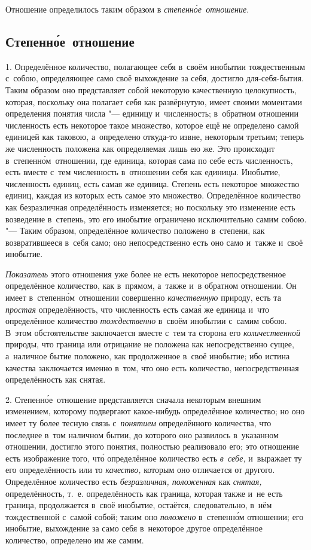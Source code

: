 Отношение определилось таким образом в {\em степенн\'{о}е~отношение}.

\subsection{Степенн\'{о}е~отношение}

1. Определённое количество, полагающее себя в~своём инобытии тождественным
с~собою, определяющее само своё выхождение за себя, достигло для-себя-бытия.
Таким образом оно представляет собой некоторую качественную целокупность,
которая, поскольку она полагает себя как развёрнутую, имеет своими моментами
определения понятия числа "--- единицу и~численность; в~обратном отношении
численность есть некоторое такое множество, которое ещё не определено самой
единицей как таковою, а~определено откуда-то извне, некоторым третьим; теперь
же численность положена как определяемая лишь ею же. Это происходит
в~степенн\'{о}м~отношении, где единица, которая сама по себе есть численность,
есть вместе с~тем численность в~отношении себя как единицы. Инобытие,
численность единиц, есть самая же единица. Степень есть некоторое множество
единиц, каждая из которых есть самое это множество. Определённое количество как
безразличная определённость изменяется; но поскольку это изменение есть
возведение в~степень, это его инобытие ограничено исключительно самим собою.
"--- Таким образом, определённое количество положено в~степени, как
возвратившееся в~себя само; оно непосредственно есть оно само и~также
и~своё инобытие.

{\em Показатель} этого отношения уже более не есть некоторое непосредственное
определённое количество, как в~прямом, а~также и~в обратном отношении. Он имеет
в~степенн\'{о}м~отношении совершенно {\em качественную} природу, есть та
{\em простая} определённость, что численность есть сама\'{я} же единица и~что
определённое количество {\em тождественно} в~своём инобытии с~самим собою.
В~этом обстоятельстве заключается вместе с~тем та сторона его
{\em количественной} природы, что граница или отрицание не положена как
непосредственно сущее, а~наличное бытие положено, как продолженное в~своё
инобытие; ибо истина качества заключается именно в~том, что оно есть
количество, непосредственная определённость как снятая.

2. Степенн\'{о}е~отношение представляется сначала некоторым внешним изменением,
которому подвергают какое-нибудь определённое количество; но оно имеет ту более
тесную связь с~{\em понятием} определённого количества, что последнее в~том
наличном бытии, до которого оно развилось в~указанном отношении, достигло этого
понятия, полностью реализовало его; это отношение есть изображение того,
чт\'{о} определённое количество есть {\em в~себе,} и~выражает ту его
определённость или то {\em качество,} которым оно отличается от другого.
Определённое количество есть {\em безразличная, положенная} как {\em снятая,}
определённость, т.~е. определённость как граница, которая также и~не есть
граница, продолжается в~своё инобытие, остаётся, следовательно, в~нём
тождественной с~самой собой; таким оно {\em положено} в~степенн\'{о}м
отношении; его инобытие, выхождение за само себя в~некоторое другое
определённое количество, определено им же самим.

